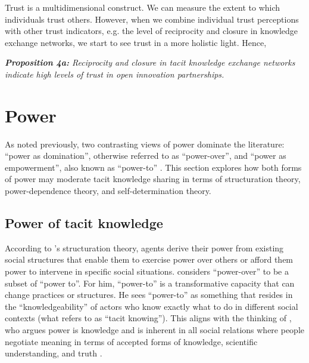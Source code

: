 Trust is a multidimensional construct. We can measure the extent to which individuals trust others. However, when we combine individual trust perceptions with other trust indicators, e.g. the level of reciprocity and closure in knowledge exchange networks, we start to see trust in a more holistic light. Hence, \bigskip

\begin{tcolorbox}
\textit{\textbf{Proposition 4a:} Reciprocity and closure in tacit knowledge exchange networks indicate high levels of trust in open innovation partnerships.}
\end{tcolorbox}

\section{Power}

As noted previously, two contrasting views of power dominate the literature: \enquote{power as domination}, otherwise referred to as \enquote{power-over}, and \enquote{power as empowerment}, also known as \enquote{power-to} \citep{haugaard2012rethinking}. This section explores how both forms of power may moderate tacit knowledge sharing in terms of structuration theory, power-dependence theory, and self-determination theory. 

\subsection{Power of tacit knowledge}

According to \citeauthor{giddens1984constitution}'s \citeyearpar{giddens1984constitution} structuration theory, agents derive their power from existing social structures that enable them to exercise power over others or afford them power to intervene in specific social situations. \citet{giddens1984constitution} considers \enquote{power-over} to be a subset of \enquote{power to}. For him, \enquote{power-to} is a transformative capacity that can change practices or structures. He sees \enquote{power-to} as something that resides in the \enquote{knowledgeability} of actors who know exactly what to do in different social contexts (what \citet{polanyi1966logic} refers to as \enquote{tacit knowing}). This aligns with the thinking of \citet{foucault1980power}, who argues power is knowledge and is inherent in all social relations where people negotiate meaning in terms of accepted forms of knowledge, scientific understanding, and truth \citep{diamond1988foucault}.\medskip

